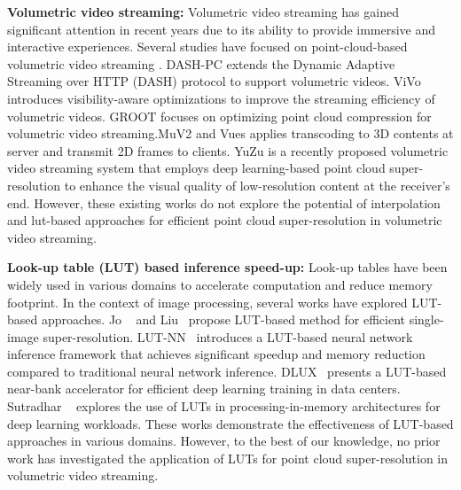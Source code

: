 
\textbf{Volumetric video streaming:}
Volumetric video streaming has gained significant attention in recent years due to its ability to provide immersive and interactive experiences. Several studies have focused on point-cloud-based volumetric video streaming \cite{lee_groot_2020,han_vivo_2020, gul2020low, gul2020cloud, hosseini2018dynamic, park2018volumetric, qian2019toward, van2019towards}. DASH-PC \cite{hosseini2018dynamic} extends the Dynamic Adaptive Streaming over HTTP (DASH) protocol to support volumetric videos. ViVo \cite{han_vivo_2020} introduces visibility-aware optimizations to improve the streaming efficiency of volumetric videos. GROOT \cite{lee_groot_2020} focuses on optimizing point cloud compression for volumetric video streaming.MuV2 \cite{liuMuV2ScalingMultiuser2024} and Vues \cite{liu_vues_2022} applies transcoding to 3D contents at server and transmit 2D frames to clients.  YuZu \cite{zhang_yuzu_nodate} is a recently proposed volumetric video streaming system that employs deep learning-based point cloud super-resolution to enhance the visual quality of low-resolution content at the receiver's end. However, these existing works do not explore the potential of interpolation and lut-based approaches for efficient point cloud super-resolution in volumetric video streaming.

\textbf{Look-up table (LUT) based inference speed-up:}
Look-up tables have been widely used in various domains to accelerate computation and reduce memory footprint. In the context of image processing, several works have explored LUT-based approaches. Jo \etal~\cite{jo_practical_2021} and Liu\etal~\cite{liu4DLUTLearnable2022} propose LUT-based method for efficient single-image super-resolution. LUT-NN~\cite{tang_lut-nn_2023} introduces a LUT-based neural network inference framework that achieves significant speedup and memory reduction compared to traditional neural network inference. DLUX~\cite{gu2020dlux} presents a LUT-based near-bank accelerator for efficient deep learning training in data centers. Sutradhar \etal ~\cite{sutradhar2021look} explores the use of LUTs in processing-in-memory architectures for deep learning workloads. These works demonstrate the effectiveness of LUT-based approaches in various domains. However, to the best of our knowledge, no prior work has investigated the application of LUTs for point cloud super-resolution in volumetric video streaming.


